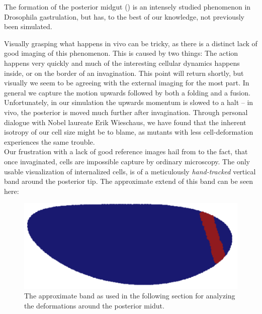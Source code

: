 The formation of the posterior midgut () is an intensely studied phenomenon in Drosophila gastrulation, but has, to the best of our knowledge, not previously been simulated.

Visually grasping what happens in vivo can be tricky, as there is a distinct lack of good imaging of this phenomenon. This is caused by two things: The action happens very quickly and much of the interesting cellular dynamics happens inside, or on the border of an invagination. This point will return shortly, but visually we seem to be agreeing with the external imaging for the most part. In general we capture the motion upwards followed by both a folding and a fusion. Unfortunately, in our simulation the upwards momentum is slowed to a halt -- in vivo, the posterior is moved much further after invagination. Through personal dialogue with Nobel laureate Erik Wieschaus, we have found that the inherent isotropy of our cell size might be to blame, as mutants with less cell-deformation experiences the same trouble.\\

Our frustration with a lack of good reference images hail from to the fact, that once invaginated, cells are impossible capture by ordinary microscopy. The only usable visualization of internalized cells, is of a meticulously \textit{hand-tracked} vertical band around the posterior tip. The approximate extend of this band can be seen here:
\begin{figure}[H]
    \centering
    \includegraphics[width=0.5\linewidth]{chapters//Results//figures/daniel_band_pos.png}
    \caption{The approximate band as used in the following section for analyzing the deformations around the posterior midut.}
\end{figure}

